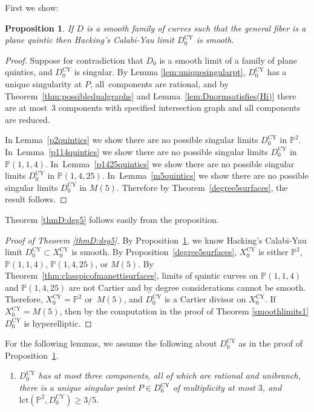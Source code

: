 \documentclass[JEP,XML,SOM,Unicode,NoFloatCountersInSection,published]{cedram}
\theoremstyle{plain}
\newtheorem{proposition}[theorem]{Proposition}
\theoremstyle{definition}
\newcommand\PP{{\mathbb{P}}}
\newcommand\lct{\mathrm{lct}}
\newcommand\Dcyo{{D^{\mathrm{CY}}_0}}
\newcommand\Do{{D_0}}
\newcommand\Xcyo{{X^{\mathrm{CY}}_0}}
\begin{document}
First we show:

\begin{proposition}\label{reducedimpliessmoothdeg5}
If $D$ is a smooth family of curves such that the general fiber is a plane quintic then Hacking's Calabi-Yau limit $\Dcyo$ is smooth.
\end{proposition}

\begin{proof}
Suppose for contradiction that $\Do$ is a smooth limit of a family of plane quintics, and $\Dcyo$ is singular. By Lemma \ref{lem:uniquesingularpt}, $\Dcyo$ has a unique singularity at $P$, all~components are rational, and by Theorem~\ref{thm:possibledualgraphs} and Lemma~\ref{lem:Dnormsatisfies(Hi)} there are at most~3 components with specified intersection graph and all components are reduced.

In Lemma~\ref{p2quintics} we show there are no possible singular limits $\Dcyo$ in $\PP^2$. In~Lemma~\ref{p114quintics} we show there are no possible singular limits $\Dcyo$ in $\PP(1,1,4)$. In~Lemma~\ref{p1425quintics} we show there are no possible singular limits $\Dcyo$ in $\PP(1,4,25)$. In~Lemma~\ref{m5quintics} we show there are no possible singular limits $\Dcyo$ in $M(5)$. Therefore by Theorem~\ref{degree5surfaces}, the result follows.
\end{proof}

Theorem \ref{thmD:deg5} follows easily from the proposition.

\begin{proof}[Proof of Theorem \ref{thmD:deg5}]
By Proposition~\ref{reducedimpliessmoothdeg5}, we know Hacking's Calabi-Yau limit $\Dcyo\subset \Xcyo$ is smooth. By Proposition~\ref{degree5surfaces}, $\Xcyo$ is either $\PP^2$, $\PP(1,1,4)$, $\PP(1,4,25)$, or $M(5)$. By Theorem~\ref{thm:classpicofmanettisurfaces}, limits of quintic curves on $\PP(1,1,4)$ and $\PP(1,4,25)$ are not Cartier and by degree considerations cannot be smooth. Therefore, $\Xcyo = \PP^2$ or~$M(5)$, and $\Dcyo$ is a Cartier divisor on $\Xcyo$. If $\Xcyo = M(5)$, then by the computation in the proof of Theorem \ref{smoothlimits1} $\Dcyo$ is hyperelliptic.
\end{proof}

For the following lemmas, we assume the following about $\Dcyo$ as in the proof of Proposition~\ref{reducedimpliessmoothdeg5}.

\begin{enumerate}
\item[($\ast$)] \textit{$\Dcyo$ has at most three components, all of which are rational and unibranch, there is a unique singular point $P\in \Dcyo$ of multiplicity at most $3$, and $\lct(\PP^2,\Dcyo)\ge 3/5$.}
\end{enumerate}
\end{document}
